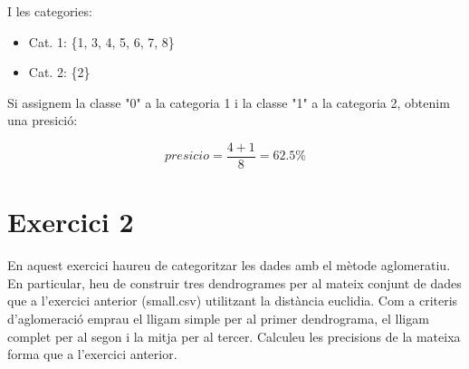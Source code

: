 \documentclass{article} %
\begin{document}
{	I les categories:

	\begin{itemize}
		\item[] Cat. 1: \{1, 3, 4, 5, 6, 7, 8\}
		\item[] Cat. 2: \{2\}
	\end{itemize}

	Si assignem la classe "0" a la categoria 1 i la classe "1" a la categoria 2, obtenim una presició:

	\[presicio = \frac{4 + 1}{8} = 62.5\%\]
}

\section{Exercici 2}
En aquest exercici haureu de categoritzar les dades amb el mètode aglomeratiu. En particular, heu de construir tres dendrogrames per al mateix conjunt de dades que a l'exercici anterior (small.csv) utilitzant la distància euclidia. Com a criteris d'aglomeració emprau el lligam simple per al primer dendrograma, el lligam complet per al segon i la mitja per al tercer. Calculeu les precisions de la mateixa forma que a l'exercici anterior.
\\
\end{document}
